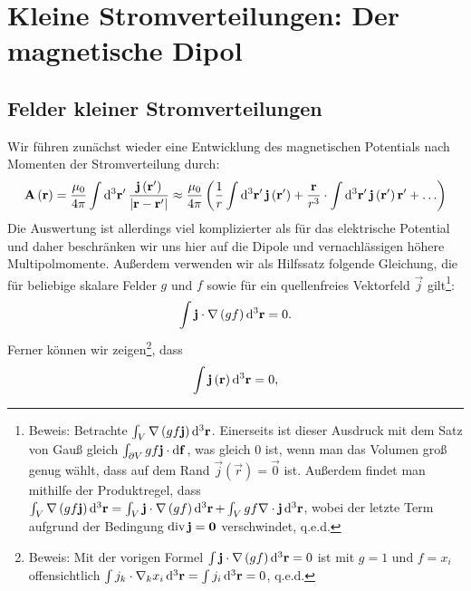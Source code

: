 \section{Kleine Stromverteilungen: Der magnetische Dipol}

\subsection{Felder kleiner Stromverteilungen}

Wir führen zunächst wieder eine Entwicklung des magnetischen Potentials nach Momenten der Stromverteilung durch:
\begin{equation}
	\label{eq:entwicklung_magn_potential}
	\vec {A}\left(\vec {r}\right)=\frac{\mu _{0}}{4\pi }\int \diffa[3]{\vec{r}'}\frac{\vec {j}\left(\vec {r}'\right)}{\left| \vec {r}-\vec {r}'\right| }\approx \frac{\mu _{0}}{4\pi }\left(\frac{1}{r}\int \diffa[3]{\vec{r}'}\vec {j}\left(\vec {r}'\right)+\frac{\vec {r}}{r^{3}}\cdot \int \diffa[3]{\vec{r}'}\vec {j}\left(\vec {r}'\right)\vec {r}'+\ldots \right)
\end{equation}
Die Auswertung ist allerdings viel komplizierter als für das elektrische Potential und daher beschränken wir uns hier auf die Dipole und vernachlässigen höhere Multipolmomente. Außerdem verwenden wir als Hilfssatz folgende Gleichung, die für beliebige skalare Felder $g$ und $f$ sowie für ein quellenfreies Vektorfeld $\vec {j}$ gilt\footnote{Beweis: Betrachte $\int _{V}\nabla \left(gf\vec {j}\right)\diffa[3]{\vec{r}}$. Einerseits ist dieser Ausdruck mit dem Satz von Gauß gleich $\int _{\partial V}gf\vec {j}\cdot \diff \vec {f}$, was gleich $0$ ist, wenn man das Volumen groß genug wählt, dass auf dem Rand $\vec {j}\left(\vec {r}\right)=\vec {0}$ ist. Außerdem findet man mithilfe der Produktregel, dass $\int _{V}\nabla \left(gf\vec {j}\right)\diffa[3]{\vec{r}}=\int _{V}\vec {j}\cdot \nabla \left(gf\right)\diffa[3]{\vec{r}}+\int _{V}gf\nabla \cdot \vec {j}\diffa[3]{\vec{r}}$, wobei der letzte Term aufgrund der Bedingung $\divg \vec {j}=\vec {0}$ verschwindet, q.e.d.}:
\begin{equation}
	\label{eq:hilfssatz}
	\int \vec {j}\cdot \nabla \left(gf\right)\diffa[3]{\vec{r}}=0.
\end{equation}
Ferner können wir zeigen\footnote{Beweis: Mit der vorigen Formel $\int \vec {j}\cdot \nabla \left(gf\right)\diffa[3]{\vec{r}}=0$ ist mit $g=1$ und $f=x_{i}$ offensichtlich $\int j_{k}\cdot \nabla _{k}x_{i}\diffa[3]{\vec{r}}=\int j_{i}\diffa[3]{\vec{r}}=0$, q.e.d. }, dass
\begin{equation*}
	\int \vec {j}\left(\vec {r}\right)\diffa[3]{\vec{r}}=0,
\end{equation*}
